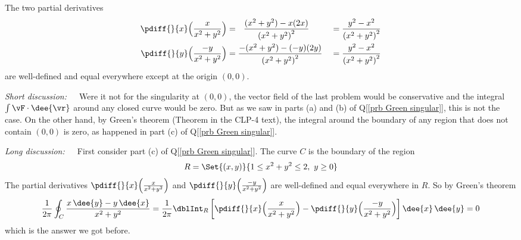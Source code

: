 \begin{solution}
The two partial derivatives
\begin{alignat*}{3}
\pdiff{}{x}\Big( \frac{x}{x^2+y^2}\Big)
&=\ \ \frac{(x^2+y^2)-x(2x)}{{(x^2+y^2)}^2}
&&=\frac{y^2-x^2}{{(x^2+y^2)}^2}\\
\pdiff{}{y}\Big( \frac{-y}{x^2+y^2}\Big)
&=\frac{-(x^2+y^2)-(-y)(2y)}{{(x^2+y^2)}^2}
&&=\frac{y^2-x^2}{{(x^2+y^2)}^2}\\
\end{alignat*}
are well-defined and equal everywhere except at the origin $(0,0)$.

\emph{Short discussion:}\ \ \
Were it not for the singularity at $(0,0)$, the vector field of the last
problem would be conservative and the integral $\int\vF\cdot \dee{\vr}$
around any closed curve would be zero. But as we saw in parts (a) and (b) of
Q[\ref{prb Green singular}], this is not the case. On the other hand,
by Green's theorem  (Theorem \eref{CLP317}{thm:Green} in the CLP-4 text),
the integral around the boundary of any region that
does not contain $(0,0)$ is zero, as happened in part (c) of
Q[\ref{prb Green singular}].

\emph{Long discussion:}\ \ \ First consider part (c) of
Q[\ref{prb Green singular}]. The curve $C$ is the boundary of
the region
\begin{equation*}
R = \Set{(x,y)}{1\le x^2+y^2\le 2,\ y\ge 0}
\end{equation*}
The partial derivatives
$\pdiff{}{x}\Big( \frac{x}{x^2+y^2}\Big)$
and
$\pdiff{}{y}\Big( \frac{-y}{x^2+y^2}\Big)$
are well-defined and equal everywhere in $R$. So by Green's
theorem
\begin{equation*}
\frac{1}{2\pi}\oint_C \frac{x\,\dee{y}-y\,\dee{x}}{x^2+y^2}
=\frac{1}{2\pi}\dblInt_R\left[
   \pdiff{}{x}\Big( \frac{x}{x^2+y^2}\Big)
 -\pdiff{}{y}\Big( \frac{-y}{x^2+y^2}\Big)\right]\dee{x}\, \dee{y}
=0
\end{equation*}
which is the answer we got before.


\end{solution}
